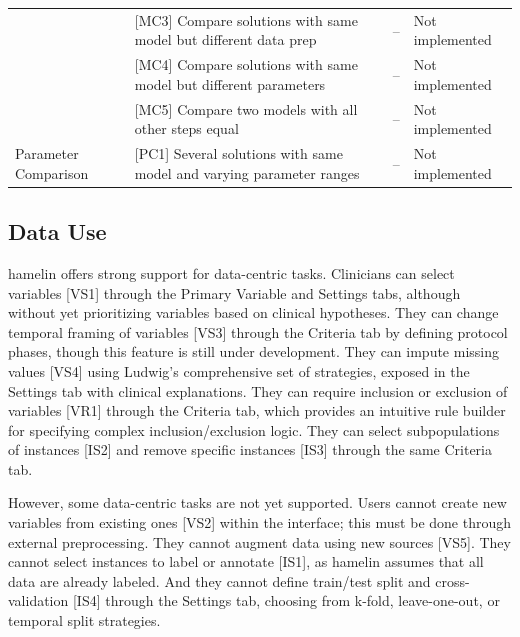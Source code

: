 \documentclass[conference,twocolumn]{IEEEtran}
\begin{document}
\begin{table}[ht]
\begin{tabularx}{\textwidth}{@{}p{} p{} p{} p{}@{}}
& \parbox[t]{0.28\textwidth}{[MC3] Compare solutions with same model but different data prep} & \parbox[t]{0.32\textwidth}{--} & \parbox[t]{0.17\textwidth}{Not implemented} \\
& \parbox[t]{0.28\textwidth}{[MC4] Compare solutions with same model but different parameters} & \parbox[t]{0.32\textwidth}{--} & \parbox[t]{0.17\textwidth}{Not implemented} \\
& \parbox[t]{0.28\textwidth}{[MC5] Compare two models with all other steps equal} & \parbox[t]{0.32\textwidth}{--} & \parbox[t]{0.17\textwidth}{Not implemented} \\
\cmidrule(lr){1-4}
\parbox[t]{0.18\textwidth}{Parameter Comparison} 
& \parbox[t]{0.28\textwidth}{[PC1] Several solutions with same model and varying parameter ranges} & \parbox[t]{0.32\textwidth}{--} & \parbox[t]{0.17\textwidth}{Not implemented} \\
\bottomrule
\end{tabularx}
\end{table}

  
\subsection{Data Use}  
  
\gls{hamelin} offers strong support for data-centric tasks. Clinicians can select variables [VS1] through the Primary Variable and Settings tabs, although without yet prioritizing variables based on clinical hypotheses. They can change temporal framing of variables [VS3] through the Criteria tab by defining protocol phases, though this feature is still under development. They can impute missing values [VS4] using Ludwig's comprehensive set of strategies, exposed in the Settings tab with clinical explanations. They can require inclusion or exclusion of variables [VR1] through the Criteria tab, which provides an intuitive rule builder for specifying complex inclusion/exclusion logic. They can select subpopulations of instances [IS2] and remove specific instances [IS3] through the same Criteria tab.
  
However, some data-centric tasks are not yet supported. Users cannot create new variables from existing ones [VS2] within the interface; this must be done through external preprocessing. They cannot augment data using new sources [VS5]. They cannot select instances to label or annotate [IS1], as \gls{hamelin} assumes that all data are already labeled. And they cannot define train/test split and cross-validation [IS4] through the Settings tab, choosing from k-fold, leave-one-out, or temporal split strategies.
  
\end{document}
